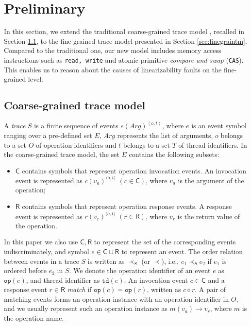 \documentclass[runningheads]{llncs}
\newcommand{\ecall}{\mathsf{C}}
\newcommand{\eresp}{\mathsf{R}}
\begin{document}
\section{Preliminary}\label{sec:fgtracemodel}


In this section, we extend the traditional coarse-grained trace model \cite{DBLP:conf/popl/BouajjaniEEH15}, recalled in Section \ref{sec:coarsegraintm}, to the fine-grained trace model presented in Section \ref{sec:finegraintm}. Compared to the traditional one, our new model includes memory access instructions such as \texttt{read, write} and atomic primitive \textit{compare-and-swap} (\texttt{CAS}). This enables us to reason about the causes of linearizability faults on the fine-grained level.

\subsection{Coarse-grained trace model}\label{sec:coarsegraintm}
A \textit{trace} $S$ is a finite sequence of events $e(\mathit{Arg})^{\left\langle o,t\right\rangle}$, where $e$ is an event symbol ranging over a pre-defined set $E$, $\mathit{Arg}$ represents the list of arguments, $o$ belongs to a set $O$ of operation identifiers and $t$ belongs to a set $T$ of thread identifiers. In the coarse-grained trace model, the set $E$ contains the following subsets:
\begin{itemize}
  \item $\ecall$ contains symbols that represent operation invocation events. An invocation event is represented as $c(v_a)^{\langle o,t\rangle}$ $(c\in \ecall)$, where $v_a$ is the argument of the operation;
  \item $\eresp$ contains symbols that represent operation response events. A response event is represented as $r(v_r)^{\langle o,t\rangle}$ $(r\in \eresp)$, where $v_r$ is the return value of the operation.
\end{itemize}
\noindent In this paper we also use $\ecall, \eresp$ to represent the set of the corresponding events indiscriminately, and symbol $e\in \ecall\cup \eresp$ to represent an event. The order relation between events in a trace $S$ is written as $\prec_S$ (or $\prec$), i.e., $e_1\prec_S e_2$ if $e_1$ is ordered before $e_2$ in $S$. We denote the operation identifier of an event $e$ as $\mathtt{op}(e)$, and thread identifier as $\mathtt{td}(e)$. An invocation event $c\in \ecall$ and a response event $r\in \eresp$ \textit{match} if $\mathtt{op}(c) = \mathtt{op}(r)$, written as $c\diamond r$. A pair of matching events forms an operation instance with an operation identifier in $O$, and we usually represent such an operation instance as $m(v_a)\to v_r$, where $m$ is the operation name.
 
\end{document}
